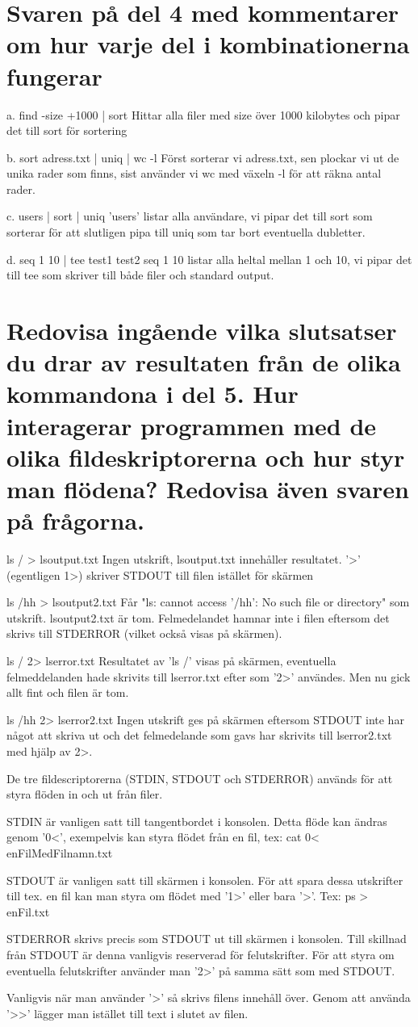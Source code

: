 \documentclass[11pt]{article}
\begin{document}
\section{Svaren på del 4 med kommentarer om hur varje del i kombinationerna fungerar}
a. find -size  +1000 | sort
Hittar alla filer med size över 1000 kilobytes och pipar det till sort för sortering

b. sort adress.txt | uniq | wc -l
Först sorterar vi adress.txt, sen plockar vi ut de unika rader som finns, sist använder vi wc med växeln -l för att räkna antal rader. 

c. users | sort | uniq
'users' listar alla användare, vi pipar det till sort som sorterar för att slutligen pipa till uniq som tar bort eventuella dubletter.

d. seq 1 10 | tee test1 test2
seq 1 10 listar alla heltal mellan 1 och 10, vi pipar det till tee som skriver till både filer och standard output.


\section{Redovisa ingående vilka slutsatser du drar av resultaten från de olika kommandona i del 5. Hur interagerar programmen med de olika fildeskriptorerna och hur styr man flödena? Redovisa även svaren på frågorna.}
ls / > lsoutput.txt
Ingen utskrift, lsoutput.txt innehåller resultatet. '>' (egentligen 1>) skriver STDOUT till filen istället för skärmen

ls /hh > lsoutput2.txt
Får "ls: cannot access '/hh': No such file or directory" som utskrift. lsoutput2.txt är tom. Felmedelandet hamnar inte i filen eftersom det skrivs till STDERROR (vilket också visas på skärmen).

ls / 2> lserror.txt
Resultatet av 'ls /' visas på skärmen, eventuella felmeddelanden hade skrivits till lserror.txt efter som '2>' användes. Men nu gick allt fint och filen är tom.

ls /hh 2> lserror2.txt
Ingen utskrift ges på skärmen eftersom STDOUT inte har något att skriva ut och det felmedelande som gavs har skrivits till lserror2.txt med hjälp av 2>.

De tre fildescriptorerna (STDIN, STDOUT och STDERROR) används för att styra flöden in och ut från filer. 

STDIN är vanligen satt till tangentbordet i konsolen. Detta flöde kan ändras genom '0<', exempelvis kan styra flödet från en fil, tex:
cat 0< enFilMedFilnamn.txt

STDOUT är vanligen satt till skärmen i konsolen. För att spara dessa utskrifter till tex. en fil kan man styra om flödet med '1>' eller bara '>'. Tex: 
ps > enFil.txt

STDERROR skrivs precis som STDOUT ut till skärmen i konsolen. Till skillnad från STDOUT är denna vanligvis reserverad för felutskrifter. För att styra om eventuella felutskrifter använder man '2>' på samma sätt som med STDOUT.

Vanligvis när man använder '>' så skrivs filens innehåll över. Genom att använda '>>' lägger man istället till text i slutet av filen. 
\end{document}
